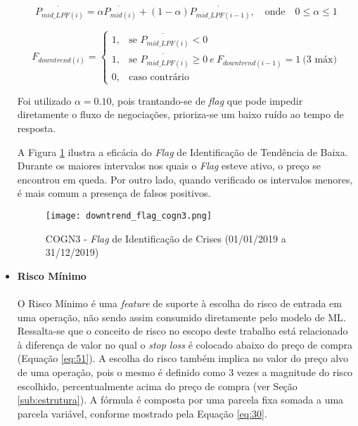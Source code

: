 \begin{itemize}
    \begin{equation} \label{eq:24}
        \dot{P_{mid\_LPF(i)}} = \alpha \dot{P_{mid(i)}} + (1 - \alpha) \dot{P_{mid\_LPF(i-1)}},  \quad \textrm{onde} \quad 0 \le \alpha \le 1
    \end{equation}

    \begin{equation} \label{eq:25}
        F_{downtrend(i)} = \begin{cases} 1, & \mbox{se } \dot{P_{mid\_LPF(i)}} < 0 \\
            1, & \mbox{se } \dot{P_{mid\_LPF(i)}} \ge 0 \  e \  F_{downtrend(i-1)} = 1 \  \textrm{(3 m\'ax)} \\
            0, & \mbox{caso contr\'ario} \end{cases}
    \end{equation}

    Foi utilizado \begin{math} \alpha = 0.10 \end{math}, pois trantando-se de \textit{flag} que pode impedir diretamente o fluxo de negociações, prioriza-se um baixo ruído ao tempo de resposta.

    A Figura \ref{fig:109} ilustra a eficácia do \textit{Flag} de Identificação de Tendência de Baixa. Durante os maiores intervalos nos quais o \textit{Flag} esteve ativo, o preço se encontrou em queda. Por outro lado, quando verificado os intervalos menores, é mais comum a presença de falsos positivos.

    \begin{figure}[!htb]
        \texttt{[image: downtrend\_flag\_cogn3.png]}
        \centering
        \caption{COGN3 - \textit{Flag} de Identificação de Crises (01/01/2019 a 31/12/2019)}
        \label{fig:109}
    \end{figure}

    \item \textbf{Risco Mínimo} \\ \\
    O Risco Mínimo é uma \textit{feature} de suporte à escolha do risco de entrada em uma operação, não sendo assim consumido diretamente pelo modelo de ML. Ressalta-se que o conceito de risco no escopo deste trabalho está relacionado à diferença de valor no qual o \textit{stop loss} é colocado abaixo do preço de compra (Equação \ref{eq:51}). A escolha do risco também implica no valor do preço alvo de uma operação, pois o mesmo é definido como 3 vezes a magnitude do risco escolhido, percentualmente acima do preço de compra (ver Seção \ref{sub:estrutura}). A fórmula é composta por uma parcela fixa somada a uma parcela variável, conforme mostrado pela Equação \ref{eq:30}.


\end{itemize}
